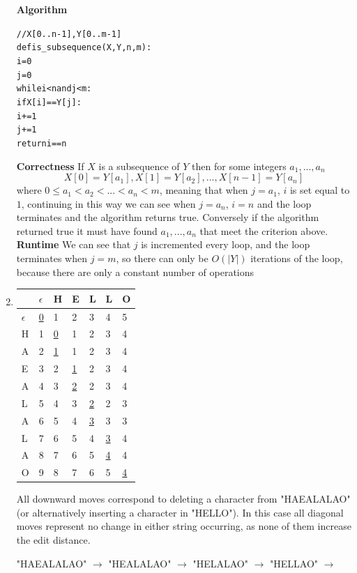 \documentclass[11pt]{article}
\begin{document}
\begin{enumerate}
		\textbf{Algorithm}
		\begin{alltt}
		// X[0..n-1], Y[0..m-1]
		def is_subsequence(X,Y,n,m):
		    i = 0 
		    j = 0
		    while i < n and j < m:
		      if X[i] == Y[j]:
		        i += 1
		      j += 1
		    return i==n
		\end{alltt}
		\textbf{Correctness}
		If $X$ is a subsequence of $Y$ then for some integers $a_1,...,a_n$ 
			$$X[0] = Y[a_1], X[1] = Y[a_2],..., X[n-1] = Y[a_n]$$
		where $0 \leq a_1 < a_2 < ... < a_n <  m $, meaning that when
		$j = a_1$, $i$ is set equal to $1$, continuing in this way we
		can see when $j= a_n$, $i = n$ and the loop terminates and the
		algorithm returns true.
		Conversely if the algorithm returned true it must have found
		$a_1,...,a_n$ that meet the criterion above.\\
		\textbf{Runtime}
		We can see that $j$ is incremented every loop, and the loop
		terminates when $j = m$, so there can only be $O(|Y|)$
		iterations of the loop, because there are only a constant number
		of operations
		\item 
		\begin{center}
		\begin{tabular}{l|l l l l l l}
			&$\epsilon$&H&E&L&L&O\\
			\hline
			$\epsilon$&\underline{0}&1&2&3&4&5\\
			H&1&\underline{0}&1&2&3&4\\
			A&2&\underline{1}&1&2&3&4\\
			E&3&2&\underline{1}&2&3&4\\
			A&4&3&\underline{2}&2&3&4\\
			L&5&4&3&\underline{2}&2&3\\
			A&6&5&4&\underline{3}&3&3\\
			L&7&6&5&4&\underline{3}&4\\
			A&8&7&6&5&\underline{4}&4\\
			O&9&8&7&6&5&\underline{4}\\
		\end{tabular}
		\end{center}
			All downward moves correspond to deleting a character
			from "HAEALALAO" (or alternatively inserting a character
			in "HELLO"). In this case all diagonal moves 
			represent no change in either string occurring, as none
			of them increase 
			the edit distance.\\
			\begin{center}
			"HAEALALAO" $\rightarrow$
			"HEALALAO" $\rightarrow$
			"HELALAO" $\rightarrow$
			"HELLAO" $\rightarrow$

\end{center}
\end{enumerate}
\end{document}
